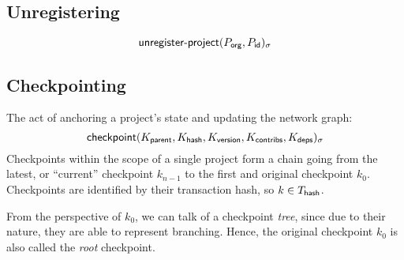 \subsection{Unregistering}
\[
    \operatorname{\mathsf{unregister-project}}\lparen P_{\mathsf{org}}, P_{\mathsf{id}}\rparen_\sigma
\]



\subsection{Checkpointing}
\label{s:checkpoint}
The act of anchoring a project's state and updating the network graph:
\[
    \operatorname{\mathsf{checkpoint}}\lparen K_{\mathsf{parent}}, K_{\mathsf{hash}}, K_{\mathsf{version}},
    K_{\mathsf{contribs}}, K_{\mathsf{deps}}\rparen_\sigma
\]
Checkpoints within the scope of a single project form a chain going from the
latest, or ``current'' checkpoint $k_{n-1}$ to the first and original
checkpoint $k_0$. Checkpoints are identified by their transaction hash,
so $k \in T_{\mathsf{hash}}$.

From the perspective of $k_0$, we can talk of a checkpoint \emph{tree}, since
due to their nature, they are able to represent branching. Hence, the original
checkpoint $k_0$ is also called the \emph{root} checkpoint.


